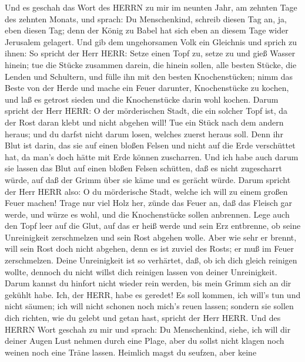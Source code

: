  Und es geschah das Wort des HERRN zu mir im neunten Jahr,
am zehnten Tage des zehnten Monats, und sprach:  Du
Menschenkind, schreib diesen Tag an, ja, eben diesen Tag; denn der König
zu Babel hat sich eben an diesem Tage wider Jerusalem gelagert.
 Und gib dem ungehorsamen Volk ein Gleichnis und sprich zu
ihnen: So spricht der Herr HERR: Setze einen Topf zu, setze zu und gieß
Wasser hinein;  tue die Stücke zusammen darein, die hinein
sollen, alle besten Stücke, die Lenden und Schultern, und fülle ihn mit
den besten Knochenstücken;  nimm das Beste von der Herde und
mache ein Feuer darunter, Knochenstücke zu kochen, und laß es getrost
sieden und die Knochenstücke darin wohl kochen.  Darum
spricht der Herr HERR: O der mörderischen Stadt, die ein solcher Topf
ist, da der Rost daran klebt und nicht abgehen will! Tue ein Stück nach
dem andern heraus; und du darfst nicht darum losen, welches zuerst
heraus soll.  Denn ihr Blut ist darin, das sie auf einen
bloßen Felsen und nicht auf die Erde verschüttet hat, da man's doch
hätte mit Erde können zuscharren.  Und ich habe auch darum
sie lassen das Blut auf einen bloßen Felsen schütten, daß es nicht
zugescharrt würde, auf daß der Grimm über sie käme und es gerächt würde.
 Darum spricht der Herr HERR also: O du mörderische Stadt,
welche ich will zu einem großen Feuer machen!  Trage nur
viel Holz her, zünde das Feuer an, daß das Fleisch gar werde, und würze
es wohl, und die Knochenstücke sollen anbrennen.  Lege auch
den Topf leer auf die Glut, auf das er heiß werde und sein Erz
entbrenne, ob seine Unreinigkeit zerschmelzen und sein Rost abgehen
wolle.  Aber wie sehr er brennt, will sein Rost doch nicht
abgehen, denn es ist zuviel des Rosts; er muß im Feuer zerschmelzen.
 Deine Unreinigkeit ist so verhärtet, daß, ob ich dich
gleich reinigen wollte, dennoch du nicht willst dich reinigen lassen von
deiner Unreinigkeit. Darum kannst du hinfort nicht wieder rein werden,
bis mein Grimm sich an dir gekühlt habe.  Ich, der HERR,
habe es geredet! Es soll kommen, ich will's tun und nicht säumen; ich
will nicht schonen noch mich's reuen lassen; sondern sie sollen dich
richten, wie du gelebt und getan hast, spricht der Herr HERR.
 Und des HERRN Wort geschah zu mir und sprach:
 Du Menschenkind, siehe, ich will dir deiner Augen Lust
nehmen durch eine Plage, aber du sollst nicht klagen noch weinen noch
eine Träne lassen.  Heimlich magst du seufzen, aber keine
